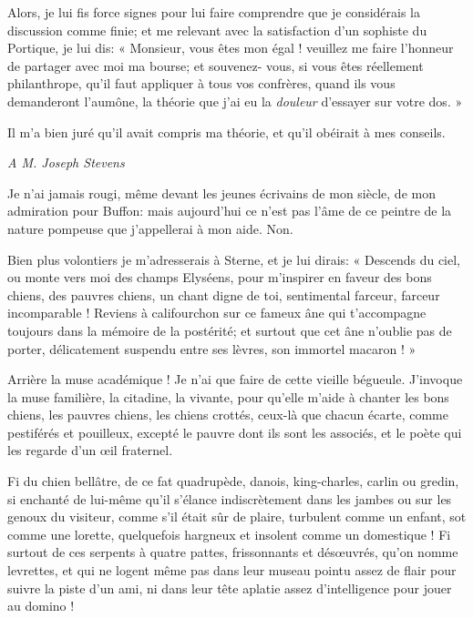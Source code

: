 Alors, je lui fis force signes pour lui faire comprendre que je
considérais la discussion comme finie; et me relevant avec la
satisfaction d’un sophiste du Portique, je lui dis: «
Monsieur, vous êtes mon égal ! veuillez me faire
l’honneur de partager avec moi ma bourse; et
souvenez{}- vous, si vous êtes réellement philanthrope,
qu’il faut appliquer à tous vos confrères, quand ils
vous demanderont l’aumône, la théorie que
j’ai eu la \textit{douleur} d’essayer sur
votre dos. »

Il m’a bien juré qu’il avait compris
ma théorie, et qu’il obéirait à mes conseils.


\begin{flushright}
\textit{A M. Joseph Stevens} 
\end{flushright}

Je n’ai jamais rougi, même devant les jeunes écrivains
de mon siècle, de mon admiration pour Buffon: mais
aujourd’hui ce n’est pas
l’âme de ce peintre de la nature pompeuse que
j’appellerai à mon aide. Non.

Bien plus volontiers je m’adresserais à Sterne, et je
lui dirais: « Descends du ciel, ou monte vers moi des champs Elyséens,
pour m’inspirer en faveur des bons chiens, des pauvres
chiens, un chant digne de toi, sentimental farceur, farceur
incomparable ! Reviens à califourchon sur ce fameux âne qui
t’accompagne toujours dans la mémoire de la postérité;
et surtout que cet âne n’oublie pas de porter,
délicatement suspendu entre ses lèvres, son immortel macaron ! »

Arrière la muse académique ! Je n’ai que faire de cette
vieille bégueule. J’invoque la muse familière, la
citadine, la vivante, pour qu’elle
m’aide à chanter les bons chiens, les pauvres chiens,
les chiens crottés, ceux{}-là que chacun écarte, comme pestiférés et
pouilleux, excepté le pauvre dont ils sont les associés, et le poète
qui les regarde d’un \oe il fraternel.

Fi du chien bellâtre, de ce fat quadrupède, danois, king{}-charles,
carlin ou gredin, si enchanté de lui{}-même qu’il
s’élance indiscrètement dans les jambes ou sur les
genoux du visiteur, comme s’il était sûr de plaire,
turbulent comme un enfant, sot comme une lorette, quelquefois hargneux
et insolent comme un domestique ! Fi surtout de ces serpents à quatre
pattes, frissonnants et dés\oe uvrés, qu’on nomme
levrettes, et qui ne logent même pas dans leur museau pointu assez de
flair pour suivre la piste d’un ami, ni dans leur tête
aplatie assez d’intelligence pour jouer au domino !

